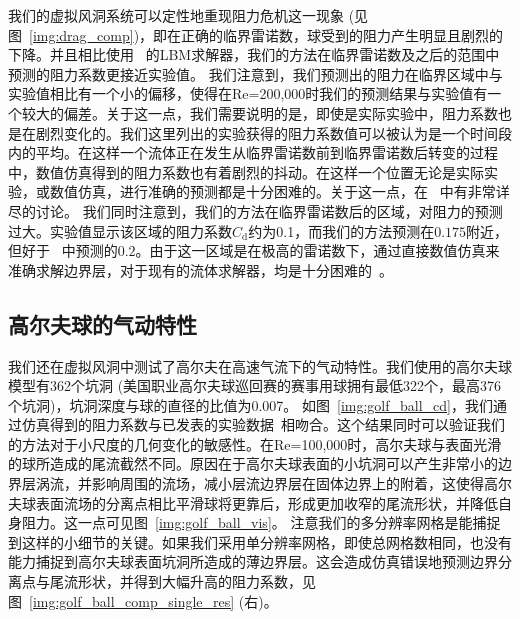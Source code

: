 我们的虚拟风洞系统可以定性地重现阻力危机这一现象 (见图~\ref{img:drag_comp})，即在正确的临界雷诺数，球受到的阻力产生明显且剧烈的下降。并且相比使用~\citep{Tao-2018-b} 的LBM求解器，我们的方法在临界雷诺数及之后的范围中预测的阻力系数更接近实验值。
我们注意到，我们预测出的阻力在临界区域中与实验值相比有一个小的偏移，使得在Re=200,000时我们的预测结果与实验值有一个较大的偏差。关于这一点，我们需要说明的是，即使是实际实验中，阻力系数也是在剧烈变化的。我们这里列出的实验获得的阻力系数值可以被认为是一个时间段内的平均。在这样一个流体正在发生从临界雷诺数前到临界雷诺数后转变的过程中，数值仿真得到的阻力系数也有着剧烈的抖动。在这样一个位置无论是实际实验，或数值仿真，进行准确的预测都是十分困难的。关于这一点，在~\citep{Geier-2017-b} 中有非常详尽的讨论。
我们同时注意到，我们的方法在临界雷诺数后的区域，对阻力的预测过大。实验值显示该区域的阻力系数$C_\text{d}$约为0.1，而我们的方法预测在$0.175$附近，但好于~\citep{Tao-2018-b} 中预测的$0.2$。由于这一区域是在极高的雷诺数下，通过直接数值仿真来准确求解边界层，对于现有的流体求解器，均是十分困难的~\citep{Tiwari-2020}。

\subsection{高尔夫球的气动特性}
我们还在虚拟风洞中测试了高尔夫在高速气流下的气动特性。我们使用的高尔夫球模型有362个坑洞 (美国职业高尔夫球巡回赛的赛事用球拥有最低322个，最高376个坑洞)，坑洞深度与球的直径的比值为0.007。
如图~\ref{img:golf_ball_cd}，我们通过仿真得到的阻力系数与已发表的实验数据~\citep{Bearman-1976, Aoki-2010}相吻合。这个结果同时可以验证我们的方法对于小尺度的几何变化的敏感性。在Re=100,000时，高尔夫球与表面光滑的球所造成的尾流截然不同。原因在于高尔夫球表面的小坑洞可以产生非常小的边界层涡流，并影响周围的流场，减小层流边界层在固体边界上的附着，这使得高尔夫球表面流场的分离点相比平滑球将更靠后，形成更加收窄的尾流形状，并降低自身阻力。这一点可见图~\ref{img:golf_ball_vis}。
注意我们的多分辨率网格是能捕捉到这样的小细节的关键。如果我们采用单分辨率网格，即使总网格数相同，也没有能力捕捉到高尔夫球表面坑洞所造成的薄边界层。这会造成仿真错误地预测边界分离点与尾流形状，并得到大幅升高的阻力系数，见图~\ref{img:golf_ball_comp_single_res} (右)。

